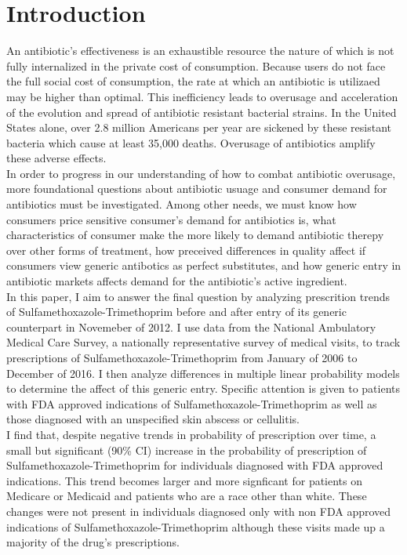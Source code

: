 \chapter{Introduction}
An antibiotic's effectiveness is an exhaustible resource the nature of which is not fully internalized in the private cost of consumption. Because users do not face the full social cost of consumption, the rate at which an antibiotic is utilizaed may be higher than optimal. This inefficiency leads to overusage and acceleration of the evolution and spread of antibiotic resistant bacterial strains. In the United States alone, over 2.8 million Americans per year are sickened by these resistant bacteria which cause at least 35,000 deaths\cite{centers_for_disease_control_and_prevention_us_antibiotic_2019}. Overusage of antibiotics amplify these adverse effects\cite{gerber_outpatient_2019}.\\
\indent In order to progress in our understanding of how to combat antibiotic overusage, more foundational questions about antibiotic usuage and consumer demand for antibiotics must be investigated. Among other needs, we must know how consumers price sensitive consumer's demand for antibiotics is, what characteristics of consumer make the more likely to demand antibiotic therepy over other forms of treatment, how preceived differences in quality affect if consumers view generic antibotics as perfect substitutes, and how generic entry in antibiotic markets affects demand for the antibiotic's active ingredient.\\
\indent In this paper, I aim to answer the final question by analyzing prescrition trends of Sulfamethoxazole-Trimethoprim before and after entry of its generic counterpart in Novemeber of 2012. I use data from the National Ambulatory Medical Care Survey, a nationally representative survey of medical visits, to track prescriptions of Sulfamethoxazole-Trimethoprim from January of 2006 to December of 2016. I then analyze differences in multiple linear probability models to determine the affect of this generic entry. Specific attention is given to patients with FDA approved indications of Sulfamethoxazole-Trimethoprim as well as those diagnosed with an unspecified skin abscess or cellulitis.\\
\indent I find that, despite negative trends in probability of prescription over time, a small but significant (90\% CI) increase in the probability of prescription of Sulfamethoxazole-Trimethoprim for individuals diagnosed with FDA approved indications. This trend becomes larger and more signficant for patients on Medicare or Medicaid and patients who are a race other than white. These changes were not present in individuals diagnosed only with non FDA approved indications of Sulfamethoxazole-Trimethoprim although these visits made up a majority of the drug's prescriptions.
